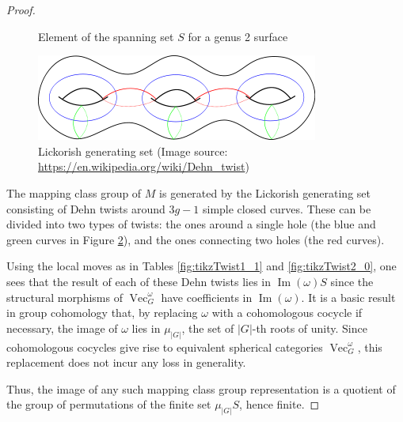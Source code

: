 \documentclass{amsart}
\DeclareMathOperator{\Vect}{Vec}
\DeclareMathOperator{\Img}{Im}
\begin{document}
\begin{proof}
\begin{figure}
\caption{Element of the spanning set $S$ for a genus 2 surface}
\label{fig:span}
\end{figure}

\begin{figure}
 \includegraphics[width=.60\textwidth]{lickorish.png}
 \caption{Lickorish generating set (Image source: \url{https://en.wikipedia.org/wiki/Dehn_twist})}
\label{fig:lickorish}
\end{figure}


The mapping class group of $M$ is generated by the Lickorish generating set consisting of Dehn twists around $3g-1$ simple closed curves.  These can be divided into two types of twists: the ones around a single hole (the blue and green curves in Figure \ref{fig:lickorish}), and the ones connecting two holes (the red curves).

 Using the local moves as in Tables \ref{fig:tikzTwist1_1} and \ref{fig:tikzTwist2_0}, one sees that the result of each of these Dehn twists lies in $\Img(\omega) S$ since the structural morphisms of $\Vect_G^\omega$ have coefficients in $\Img(\omega)$.  It is a basic result in group cohomology that, by replacing $\omega$ with a cohomologous cocycle if necessary,  the image of $\omega$ lies in $\mu_{|G|}$, the set of $|G|$-th roots of unity.  Since cohomologous cocycles give rise to equivalent spherical categories $\Vect_G^\omega$, this replacement does not incur any loss in generality.

Thus, the image of any such mapping class group representation is a quotient of the group of permutations of the finite set $\mu_{|G|} S$, hence finite.
\end{proof}
\end{document}
